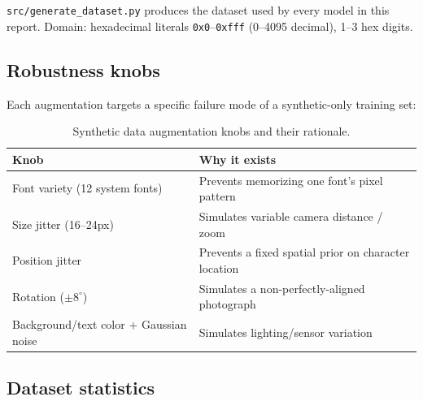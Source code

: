 \documentclass[11pt]{article}
\begin{document}
\texttt{src/generate\_dataset.py} produces the dataset used by every model in this
report. Domain: hexadecimal literals \texttt{0x0}--\texttt{0xfff} (0--4095 decimal),
1--3 hex digits.

\subsection{Robustness knobs}
Each augmentation targets a specific failure mode of a synthetic-only training set:

\begin{table}[H]
\centering
\begin{tabular}{@{}ll@{}}
\toprule
\textbf{Knob} & \textbf{Why it exists} \\
\midrule
Font variety (12 system fonts) & Prevents memorizing one font's pixel pattern \\
Size jitter (16--24px) & Simulates variable camera distance / zoom \\
Position jitter & Prevents a fixed spatial prior on character location \\
Rotation ($\pm 8^{\circ}$) & Simulates a non-perfectly-aligned photograph \\
Background/text color + Gaussian noise & Simulates lighting/sensor variation \\
\bottomrule
\end{tabular}
\caption{Synthetic data augmentation knobs and their rationale.}
\end{table}

\subsection{Dataset statistics}
\end{document}
